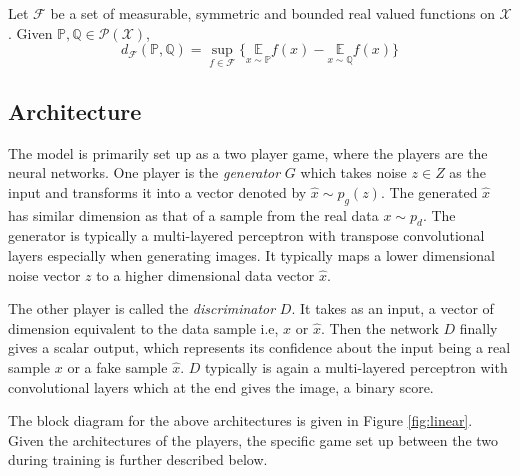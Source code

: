 \begin{definition}
\label{def:IPM}
Let $\mathscr{F}$ be a set of measurable, symmetric and bounded real valued functions on $\mathcal{X}$. Given $\mathbb{P}, \mathbb{Q} \in \mathscr{P}(\mathcal{X})$,  
    $$
d_{\mathscr{F}}(\mathbb{P}, \mathbb{Q})=\sup _{f \in \mathscr{F}}\{\underset{x \sim \mathbb{P}}{\mathbb{E}} f(x)-\underset{x \sim \mathbb{Q}}{\mathbb{E}} f(x)\}
$$

\end{definition}

\subsection{Architecture}
The model is primarily set up as a two player game, where the players are the neural networks. One player is the \emph{generator} $G$ which takes noise $z \in Z$ as the input and transforms it into a vector denoted by $\hat{x} \sim p_g(z)$. The generated $\hat{x}$ has similar dimension as that of a sample from the real data $x \sim p_d$. The generator is typically a multi-layered perceptron with transpose convolutional layers especially when generating images. It typically maps a lower dimensional noise vector $z$ to a higher dimensional data vector $\hat{x}$. 

The other player is called the \emph{discriminator} $D$. It takes as an input, a vector of dimension equivalent to the data sample i.e, $x$ or $\hat{x}$. Then the network $D$ finally gives a scalar output, which represents its confidence about the input being a real sample $x$ or a fake sample $\hat{x}$. $D$ typically is again a multi-layered perceptron with convolutional layers which at the end gives the image, a binary score.

The block diagram for the above architectures is given in Figure \ref{fig:linear}. Given the architectures of the players, the specific game set up between the two during training is further described below.










